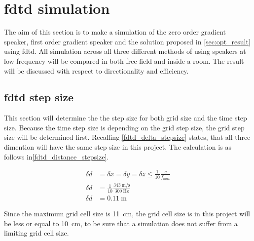 \section{\gls{fdtd} simulation} \label{sec:fdtd_simulation}
The aim of this section is to make a simulation of the zero order gradient speaker, first order gradient speaker and the solution proposed in \autoref{sec:opt_result} using \gls{fdtd}. All simulation across all three different methods of using speakers at low frequency will be compared in both free field and inside a room. The result will be discussed with respect to directionality and efficiency. 

\subsection{\gls{fdtd} step size}
This section will determine the the step size for both grid size and the time step size. Because the time step size is depending on the grid step size, the grid step size will be determined first. Recalling \autoref{fdtd_delta_stepsize} states, that all three dimention will have the same step size in this project. The calculation is as follows in\autoref{fdtd_distance_stepsize}.

\begin{subequations}\label{fdtd_distance_stepsize}
\begin{alignat}{2}
\delta d &= \delta x = \delta y = \delta z \leq \frac{1}{10} \frac{c}{f_{max}} \label{fdtd_distance_stepsize_1}\\
\delta d &= \frac{1}{10} \frac{\SI{343}{\meter\per\second}}{\SI{300}{\hertz}} \label{fdtd_distance_stepsize_2}\\
\delta d &= \SI{0.11}{\meter} \label{fdtd_distance_stepsize_3}
\end{alignat}
\end{subequations}

    \startexplain
    \stopexplain

Since the maximum grid cell size is \SI{11}{\centi\meter}, the grid cell size is in this project will be less or equal to \SI{10}{\centi\meter}, to be sure that a simulation does not suffer from a limiting grid cell size. \\

